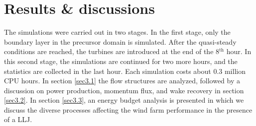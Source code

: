\documentclass[%
 aip,
 amsmath,amssymb,
reprint,
twocolumn,%
author-numerical,%
]{revtex4-1}
\begin{document}
\section{Results \& discussions}\label{sec3}
The simulations were carried out in two stages. In the first stage, only the boundary layer in the precursor domain is simulated. After the quasi-steady conditions are reached, the turbines are introduced at the end of the 8$^\text{th}$ hour. In this second stage, the simulations are continued for two more hours, and the statistics are collected in the last hour. {\color{black} Each simulation costs about 0.3 million CPU hours.}  In section \ref{sec3.1} the flow structures are analyzed, followed by a discussion on power production, momentum flux, and wake recovery in section \ref{sec3.2}. In section \ref{sec3.3}, an energy budget analysis is presented in which we discuss the diverse processes affecting the wind farm performance in the presence of a LLJ.
\end{document}
